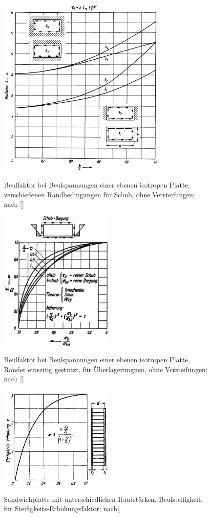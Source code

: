 \begin{figure}[h]
	\centering
	\includegraphics[width=0.75\textwidth]{Bilder/Hertel Schub.png}
	\label{fig: Hertel_Schub}
	\caption{Beulfaktor bei Beulspannungen einer ebenen isotropen Platte, verschiedenen Randbedingungen für Schub, ohne Versteifungen; nach []}
\end{figure}
\begin{figure}[h]
	\centering
	\includegraphics[width=0.5\textwidth]{Bilder/Hertel Sicherheit.png}
	\label{fig: Hertel_Sicherheit}
	\caption{Beulfaktor bei Beulspannungen einer ebenen isotropen Platte, Ränder einseitig gestützt, für Überlagerungnen, ohne Versteifungen; nach []}
\end{figure}
\begin{figure}[h]
	\centering
	\includegraphics[width=0.5\textwidth]{Bilder/Hertel Sandwich.png}
	\label{fig: Hertel_Sandwich}
	\caption{Sandwichplatte mit unterschiedlichen Hautstärken, Beulsteifigkeit, für Steifigkeits-Erhöhungsfaktor; nach[]}
\end{figure}
